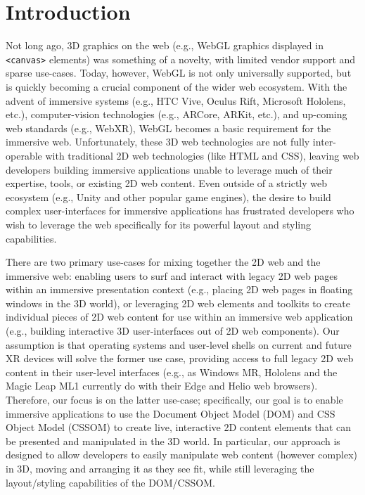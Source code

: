 \documentclass[sigconf]{acmart}
\begin{document}
\section{Introduction}
Not long ago, 3D graphics on the web (e.g., WebGL graphics displayed in \verb|<canvas>| elements) was something of a novelty, with limited vendor support and sparse use-cases. Today, however, WebGL is not only universally supported, but is quickly becoming a crucial component of the wider web ecosystem. With the advent of immersive systems (e.g., HTC Vive, Oculus Rift, Microsoft Hololens, etc.), computer-vision technologies (e.g., ARCore, ARKit, etc.), and up-coming web standards (e.g., WebXR), WebGL becomes a basic requirement for the immersive web. Unfortunately, these 3D web technologies are not fully inter-operable with traditional 2D web technologies (like HTML and CSS), leaving web developers building immersive applications unable to leverage much of their expertise, tools, or existing 2D web content. Even outside of a strictly web ecosystem (e.g., Unity and other popular game engines), the desire to build complex user-interfaces for immersive applications has frustrated developers who wish to leverage the web specifically for its powerful layout and styling capabilities. 

There are two primary use-cases for mixing together the 2D web and the immersive web: enabling users to surf and interact with legacy 2D web pages within an immersive presentation context (e.g., placing 2D web pages in floating windows in the 3D world), or leveraging 2D web elements and toolkits to create individual pieces of 2D web content for use within an immersive web application (e.g., building interactive 3D user-interfaces out of 2D web components). Our assumption is that operating systems and user-level shells on current and future XR devices will solve the former use case, providing access to full legacy 2D web content in their user-level interfaces (e.g., as Windows MR, Hololens and the Magic Leap ML1 currently do with their Edge and Helio web browsers). Therefore, our focus is on the latter use-case; specifically, our goal is to enable immersive applications to use the Document Object Model (DOM) and CSS Object Model (CSSOM) to create live, interactive 2D content elements that can be presented and manipulated in the 3D world. In particular, our approach is designed to allow developers to easily manipulate web content (however complex) in 3D, moving and arranging it as they see fit, while still leveraging the layout/styling capabilities of the DOM/CSSOM.
\end{document}
